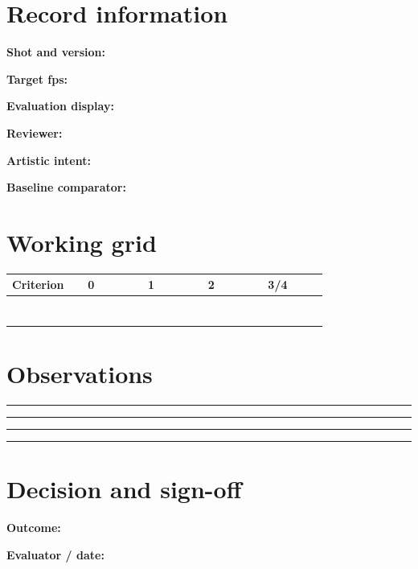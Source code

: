 \documentclass[10pt,letterpaper]{article}
\begin{document}
\makedoctitle
\makedocsummary

\section{Record information}
\noindent\textbf{Shot and version:}\quad\hrulefill\par\vspace{10pt}
\noindent\textbf{Target fps:}\quad\hrulefill\par\vspace{10pt}
\noindent\textbf{Evaluation display:}\quad\hrulefill\par\vspace{10pt}
\noindent\textbf{Reviewer:}\quad\hrulefill\par\vspace{10pt}
\noindent\textbf{Artistic intent:}\quad\hrulefill\par\vspace{10pt}
\noindent\textbf{Baseline comparator:}\quad\hrulefill\par\vspace{10pt}\section{Working grid}
\begin{longtable}{|p{0.156\linewidth}|p{0.156\linewidth}|p{0.156\linewidth}|p{0.156\linewidth}|p{0.156\linewidth}|}
\hline
\textbf{Criterion} & \textbf{0} & \textbf{1} & \textbf{2} & \textbf{3/4}\\\hline
\endhead
\rule{0pt}{20pt} &  &  &  & \\\hline
\rule{0pt}{20pt} &  &  &  & \\\hline
\rule{0pt}{20pt} &  &  &  & \\\hline
\rule{0pt}{20pt} &  &  &  & \\\hline
\rule{0pt}{20pt} &  &  &  & \\\hline
\rule{0pt}{20pt} &  &  &  & \\\hline
\rule{0pt}{20pt} &  &  &  & \\\hline
\end{longtable}
\section{Observations}
\noindent\rule{\linewidth}{0.4pt}\par\vspace{18pt}\noindent\rule{\linewidth}{0.4pt}\par\vspace{18pt}\noindent\rule{\linewidth}{0.4pt}\par\vspace{18pt}\noindent\rule{\linewidth}{0.4pt}\par\vspace{18pt}\section{Decision and sign-off}
\noindent\textbf{Outcome:}\quad\hrulefill\par\vspace{16pt}\noindent\textbf{Evaluator / date:}\quad\hrulefill\par
\end{document}
